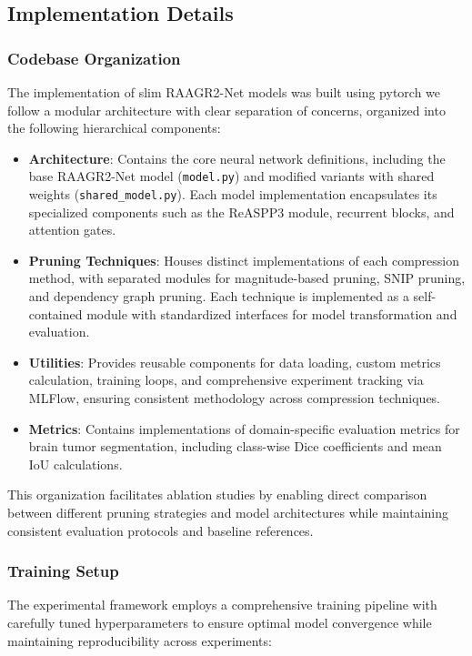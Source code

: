 \documentclass[12pt,a4paper]{article}
\begin{document}
\begin{enumerate}
\subsection{Implementation Details}
\label{sec:implementation}

\subsubsection{Codebase Organization}
The implementation of slim RAAGR2-Net models was built using pytorch we follow a modular architecture with clear separation of concerns, organized into the following hierarchical components:

\begin{itemize}
    \item \textbf{Architecture}: Contains the core neural network definitions, including the base RAAGR2-Net model (\texttt{model.py}) and modified variants with shared weights (\texttt{shared\_model.py}). Each model implementation encapsulates its specialized components such as the ReASPP3 module, recurrent blocks, and attention gates.
    
    \item \textbf{Pruning Techniques}: Houses distinct implementations of each compression method, with separated modules for magnitude-based pruning, SNIP pruning, and dependency graph pruning. Each technique is implemented as a self-contained module with standardized interfaces for model transformation and evaluation.
    
    \item \textbf{Utilities}: Provides reusable components for data loading, custom metrics calculation, training loops, and comprehensive experiment tracking via MLFlow, ensuring consistent methodology across compression techniques.
    
    \item \textbf{Metrics}: Contains implementations of domain-specific evaluation metrics for brain tumor segmentation, including class-wise Dice coefficients and mean IoU calculations.
\end{itemize}

This organization facilitates ablation studies by enabling direct comparison between different pruning strategies and model architectures while maintaining consistent evaluation protocols and baseline references.

\subsubsection{Training Setup}
The experimental framework employs a comprehensive training pipeline with carefully tuned hyperparameters to ensure optimal model convergence while maintaining reproducibility across experiments:


\end{enumerate}
\end{document}
